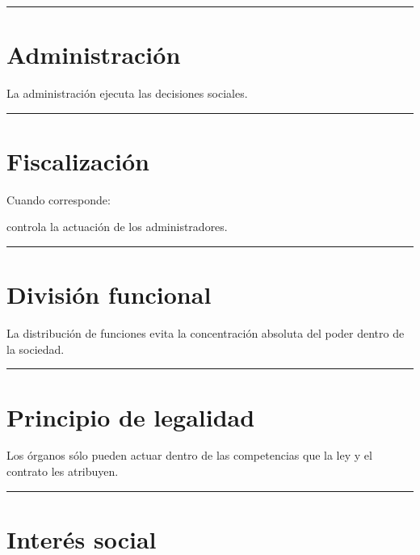 \documentclass[
  spanish,
  letterpaper,
  DIV=11,
  numbers=noendperiod]{scrartcl}
\begin{document}
\begin{center}\rule{0.5\linewidth}{0.5pt}\end{center}

\section{Administración}\label{administraciuxf3n}

La administración ejecuta las decisiones sociales.

\begin{center}\rule{0.5\linewidth}{0.5pt}\end{center}

\section{Fiscalización}\label{fiscalizaciuxf3n}

Cuando corresponde:

controla la actuación de los administradores.

\begin{center}\rule{0.5\linewidth}{0.5pt}\end{center}

\section{División funcional}\label{divisiuxf3n-funcional}

La distribución de funciones evita la concentración absoluta del poder
dentro de la sociedad.

\begin{center}\rule{0.5\linewidth}{0.5pt}\end{center}

\section{Principio de legalidad}\label{principio-de-legalidad}

Los órganos sólo pueden actuar dentro de las competencias que la ley y
el contrato les atribuyen.

\begin{center}\rule{0.5\linewidth}{0.5pt}\end{center}

\section{Interés social}\label{interuxe9s-social-1}
\end{document}
